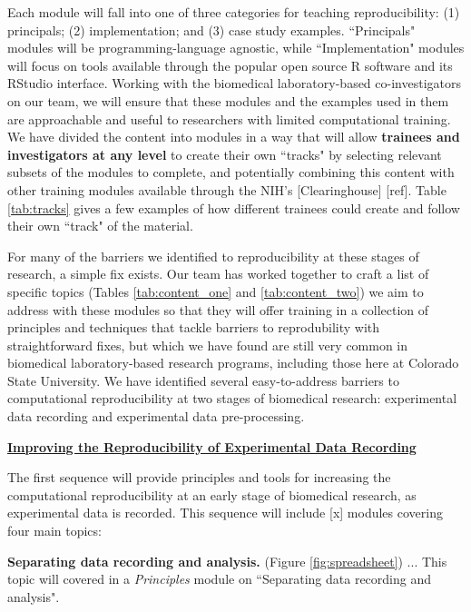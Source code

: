 \documentclass[pdftex,english,11pt,parskip=half]{scrartcl}
\begin{document}
Each module will fall into one of three categories for teaching reproducibility: (1) principals; (2) implementation; and (3) case study examples. ``Principals" modules will be programming-language agnostic, while ``Implementation" modules will focus on tools available through the popular open source R software and its RStudio interface. Working with the biomedical laboratory-based co-investigators on our team, we will ensure that these modules and the examples used in them are approachable and useful to researchers with limited computational training. We have divided the content into modules in a way that will allow \textbf{trainees and investigators at any level} to create their own ``tracks" by selecting relevant subsets of the modules to complete, and potentially combining this content with other training modules available through the NIH's [Clearinghouse] [ref]. Table \ref{tab:tracks} gives a few examples of how different trainees could create and follow their own ``track" of the material.

For many of the barriers we identified to reproducibility at these stages of research, a simple fix exists. Our team has worked together to craft a list of specific topics (Tables \ref{tab:content_one} and \ref{tab:content_two}) we aim to address with these modules so that they will offer training in a collection of principles and techniques that tackle barriers to reprodubility with straightforward fixes, but which we have found are still very common in biomedical laboratory-based research programs, including those here at Colorado State University. We have identified several easy-to-address barriers to computational reproducibility at two stages of biomedical research: experimental data recording and experimental data pre-processing.  

\underline{\textbf{Improving the Reproducibility of Experimental Data Recording}} 

The first sequence will provide principles and tools for increasing the computational reproducibility at an early stage of biomedical research, as experimental data is recorded. This sequence will include [x] modules covering four main topics: 

\textbf{Separating data recording and analysis.} (Figure \ref{fig:spreadsheet}) ... This topic will covered in a \textit{Principles} module on ``Separating data recording and analysis".
\end{document}
